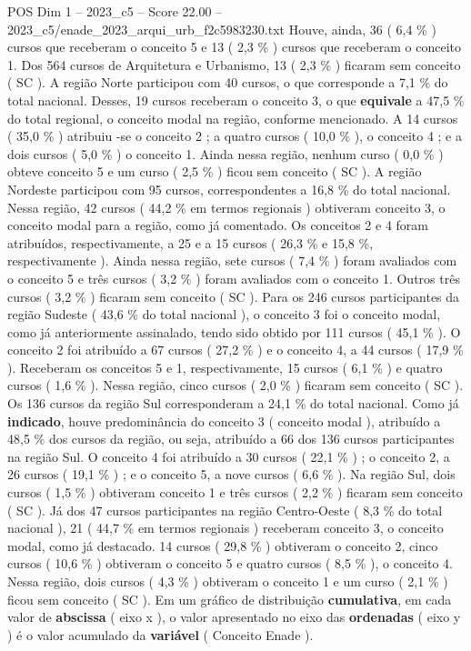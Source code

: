 \begin{textsample}{POS Dim 1 – 2023\_c5 – Score 22.00 – 2023\_c5/enade\_2023\_arqui\_urb\_f2c5983230.txt}
Houve, ainda, 36 ( 6,4 \% ) cursos que receberam o conceito 5 e 13 ( 2,3 \% ) cursos que receberam o conceito 1.
Dos 564 cursos de Arquitetura e Urbanismo, 13 ( 2,3 \% ) ficaram sem conceito ( SC ).
A região Norte participou com 40 cursos, o que corresponde a 7,1 \% do total nacional.
Desses, 19 cursos receberam o conceito 3, o que \textbf{equivale} a 47,5 \% do total regional, o conceito modal na região, conforme mencionado.
A 14 cursos ( 35,0 \% ) atribuiu -se o conceito 2 ; a quatro cursos ( 10,0 \% ), o conceito 4 ; e a dois cursos ( 5,0 \% ) o conceito 1.
Ainda nessa região, nenhum curso ( 0,0 \% ) obteve conceito 5 e um curso ( 2,5 \% ) ficou sem conceito ( SC ).
A região Nordeste participou com 95 cursos, correspondentes a 16,8 \% do total nacional.
Nessa região, 42 cursos ( 44,2 \% em termos regionais ) obtiveram conceito 3, o conceito modal para a região, como já comentado.
Os conceitos 2 e 4 foram atribuídos, respectivamente, a 25 e a 15 cursos ( 26,3 \% e 15,8 \%, respectivamente ).
Ainda nessa região, sete cursos ( 7,4 \% ) foram avaliados com o conceito 5 e três cursos ( 3,2 \% ) foram avaliados com o conceito 1.
Outros três cursos ( 3,2 \% ) ficaram sem conceito ( SC ).
Para os 246 cursos participantes da região Sudeste ( 43,6 \% do total nacional ), o conceito 3 foi o conceito modal, como já anteriormente assinalado, tendo sido obtido por 111 cursos ( 45,1 \% ).
O conceito 2 foi atribuído a 67 cursos ( 27,2 \% ) e o conceito 4, a 44 cursos ( 17,9 \% ).
Receberam os conceitos 5 e 1, respectivamente, 15 cursos ( 6,1 \% ) e quatro cursos ( 1,6 \% ).
Nessa região, cinco cursos ( 2,0 \% ) ficaram sem conceito ( SC ).
Os 136 cursos da região Sul corresponderam a 24,1 \% do total nacional.
Como já \textbf{indicado}, houve predominância do conceito 3 ( conceito modal ), atribuído a 48,5 \% dos cursos da região, ou seja, atribuído a 66 dos 136 cursos participantes na região Sul.
O conceito 4 foi atribuído a 30 cursos ( 22,1 \% ) ; o conceito 2, a 26 cursos ( 19,1 \% ) ; e o conceito 5, a nove cursos ( 6,6 \% ).
Na região Sul, dois cursos ( 1,5 \% ) obtiveram conceito 1 e três cursos ( 2,2 \% ) ficaram sem conceito ( SC ).
Já dos 47 cursos participantes na região Centro-Oeste ( 8,3 \% do total nacional ), 21 ( 44,7 \% em termos regionais ) receberam conceito 3, o conceito modal, como já destacado. 14 cursos ( 29,8 \% ) obtiveram o conceito 2, cinco cursos ( 10,6 \% ) obtiveram o conceito 5 e quatro cursos ( 8,5 \% ), o conceito 4.
Nessa região, dois cursos ( 4,3 \% ) obtiveram o conceito 1 e um curso ( 2,1 \% ) ficou sem conceito ( SC ).
Em um gráfico de distribuição \textbf{cumulativa}, em cada valor de \textbf{abscissa} ( eixo x ), o valor apresentado no eixo das \textbf{ordenadas} ( eixo y ) é o valor acumulado da \textbf{variável} ( Conceito Enade ).

\end{textsample}
